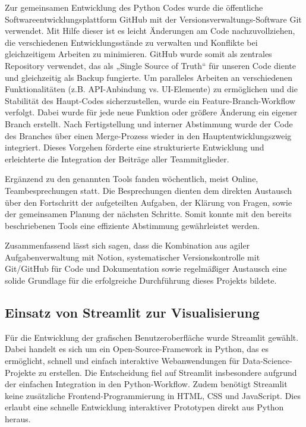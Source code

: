 Zur gemeinsamen Entwicklung des Python Codes wurde die öffentliche Softwareentwicklungsplattform GitHub mit der Versionsverwaltungs-Software Git verwendet. Mit Hilfe dieser ist es leicht Änderungen am Code nachzuvollziehen, die verschiedenen Entwicklungsstände zu verwalten und Konflikte bei gleichzeitigem Arbeiten zu minimieren. GitHub wurde somit als zentrales Repository verwendet, das als „Single Source of Truth“ für unseren Code diente und gleichzeitig als Backup fungierte. Um paralleles Arbeiten an verschiedenen Funktionalitäten (z.B. API-Anbindung vs. UI-Elemente) zu ermöglichen und die Stabilität des Haupt-Codes sicherzustellen, wurde ein Feature-Branch-Workflow verfolgt. Dabei wurde für jede neue Funktion oder größere Änderung ein eigener Branch erstellt. Nach Fertigstellung und interner Abstimmung wurde der Code des Branches über einen Merge-Prozess wieder in den Hauptentwicklungszweig integriert. Dieses Vorgehen förderte eine strukturierte Entwicklung und erleichterte die Integration der Beiträge aller Teammitglieder.

Ergänzend zu den genannten Tools fanden wöchentlich, meist Online, Teambesprechungen statt. Die Besprechungen dienten dem direkten Austausch über den Fortschritt der aufgeteilten Aufgaben, der Klärung von Fragen, sowie der gemeinsamen Planung der nächsten Schritte. Somit konnte mit den bereits beschriebenen Tools eine effiziente Abstimmung gewährleistet werden. 

Zusammenfassend lässt sich sagen, dass die Kombination aus agiler Aufgabenverwaltung mit Notion, systematischer Versionskontrolle mit Git/GitHub für Code und Dokumentation sowie regelmäßiger Austausch eine solide Grundlage für die erfolgreiche Durchführung dieses Projekts bildete.

\subsection{Einsatz von Streamlit zur Visualisierung}

Für die Entwicklung der grafischen Benutzeroberfläche wurde Streamlit gewählt. Dabei handelt es sich um ein Open-Source-Framework in Python, das es ermöglicht, schnell und einfach interaktive Webanwendungen für Data-Science-Projekte zu erstellen. Die Entscheidung fiel auf Streamlit insbesondere aufgrund der einfachen Integration in den Python-Workflow. Zudem benötigt Streamlit keine zusätzliche Frontend-Programmierung in HTML, CSS und JavaScript. Dies erlaubt eine schnelle Entwicklung interaktiver Prototypen direkt aus Python heraus. 

